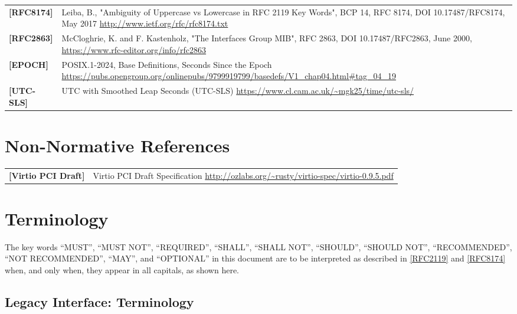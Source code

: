 \begin{longtable}{l p{5in}}
	\label{intro:rfc8174}\textbf{[RFC8174]} &
    Leiba, B., "Ambiguity of Uppercase vs Lowercase in RFC 2119 Key Words", BCP
    14, RFC 8174, DOI 10.17487/RFC8174, May 2017
        \newline\url{http://www.ietf.org/rfc/rfc8174.txt}\\
	\label{intro:rfc2863}\textbf{[RFC2863]} &
    McCloghrie, K. and F. Kastenholz, "The Interfaces Group MIB", RFC 2863, DOI 10.17487/RFC2863, June 2000, \newline\url{https://www.rfc-editor.org/info/rfc2863}\\
	\label{intro:EPOCH}\textbf{[EPOCH]} &
    POSIX.1-2024, Base Definitions, Seconds Since the Epoch
	\newline\url{https://pubs.opengroup.org/onlinepubs/9799919799/basedefs/V1_chap04.html#tag_04_19}\\
	\label{intro:UTC-SLS}\textbf{[UTC-SLS]} &
    UTC with Smoothed Leap Seconds (UTC-SLS)
	\newline\url{https://www.cl.cam.ac.uk/~mgk25/time/utc-sls/}\\
\end{longtable}

\section{Non-Normative References}

\begin{longtable}{l p{5in}}
	\label{intro:Virtio PCI Draft}\textbf{[Virtio PCI Draft]} &
	Virtio PCI Draft Specification
	\newline\url{http://ozlabs.org/~rusty/virtio-spec/virtio-0.9.5.pdf}\\
\end{longtable}

\section{Terminology}\label{Terminology}

The key words ``MUST'', ``MUST NOT'', ``REQUIRED'', ``SHALL'', ``SHALL NOT'',
``SHOULD'', ``SHOULD NOT'', ``RECOMMENDED'', ``NOT RECOMMENDED'', ``MAY'', and
``OPTIONAL'' in this document are to be interpreted as described in
\hyperref[intro:rfc2119]{[RFC2119]} and \hyperref[intro:rfc8174]{[RFC8174]} when,
and only when, they appear in all capitals, as shown here.
\subsection{Legacy Interface: Terminology}\label{intro:Legacy
Interface: Terminology}

